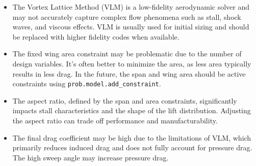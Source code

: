\documentclass{article}
\begin{document}
\begin{itemize}
    \item The Vortex Lattice Method (VLM) is a low-fidelity aerodynamic solver and may not accurately capture complex flow phenomena such as stall, shock waves, and viscous effects. VLM is usually used for initial sizing and should be replaced with higher fidelity codes when available.
    \item The fixed wing area constraint may be problematic due to the number of design variables. It's often better to minimize the area, as less area typically results in less drag. In the future, the span and wing area should be active constraints using \texttt{prob.model.add\_constraint}.
    \item The aspect ratio, defined by the span and area constraints, significantly impacts stall characteristics and the shape of the lift distribution. Adjusting the aspect ratio can trade off performance and manufacturability.
    \item The final drag coefficient may be high due to the limitations of VLM, which primarily reduces induced drag and does not fully account for pressure drag. The high sweep angle may increase pressure drag.
\end{itemize}
\end{document}
